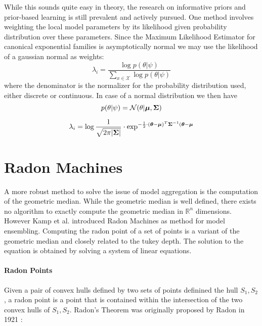 While this sounds quite easy in theory, the research on informative priors and prior-based learning is still prevalent and actively pursued.
One method involves weighting the local model parameters by its likelihood given probability distribution over these parameters.
Since the Maximum Likelihood Estimator for canonical exponential families is asymptotically normal we may use the likelihood of a gaussian normal as weights:
\begin{equation}
    \lambda_i = \frac{\log p(\theta \lvert \psi)}{\sum_{x\in \mathcal{X}} \log p(\theta \lvert \psi)}
\end{equation}
where the denominator is the normalizer for the probability distribution used, either discrete or continuous.
In case of a normal distribution we then have
\begin{equation}
    p(\theta \lvert \psi) = \mathcal{N}(\theta \lvert \boldsymbol{\mu}, \boldsymbol{\Sigma})
\end{equation}

\begin{equation}
    \lambda_i = \log \frac{1}{\sqrt{2\pi\lvert \boldsymbol{\Sigma} \rvert}} \cdot \exp^{-\frac{1}{2} \cdot (\boldsymbol{\theta} - \boldsymbol{\mu})^T\boldsymbol{\Sigma}^{-1}(\boldsymbol{\theta} - \boldsymbol{\mu}}
\end{equation}
\section{Radon Machines}
A more robust method to solve the issue of model aggregation is the computation of the geometric median.
While the geometric median is well defined, there exists no algorithm to exactly compute the geometric median in $\mathbb{R}^n$ dimensions.
However Kamp et al. \cite{kamp2017effective} introduced Radon Machines as method for model ensembling.
Computing the radon point of a set of points is a variant of the geometric median and closely related to the tukey depth. 
The solution to the equation is obtained by solving a system of linear equations.

\paragraph*{Radon Points}
Given a pair of convex hulls defined by two sets of points definined the hull $S_1, S_2$, a radon point is a point that is contained within the intersection of the two convex hulls of $S_1, S_2$. 
Radon's Theorem was originally proposed by Radon in 1921 \cite{radon1921mengen}:

